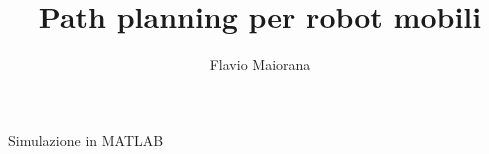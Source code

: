\documentclass[12pt,handout]{beamer}
\title{Path planning per robot mobili}
\author{Flavio Maiorana}
\begin{document}
\frame{\titlepage}

\begin{frame}{Simulazione in MATLAB}
\graphicspath{ {./figure/simulazione1} }
\end{frame}
\end{document}
